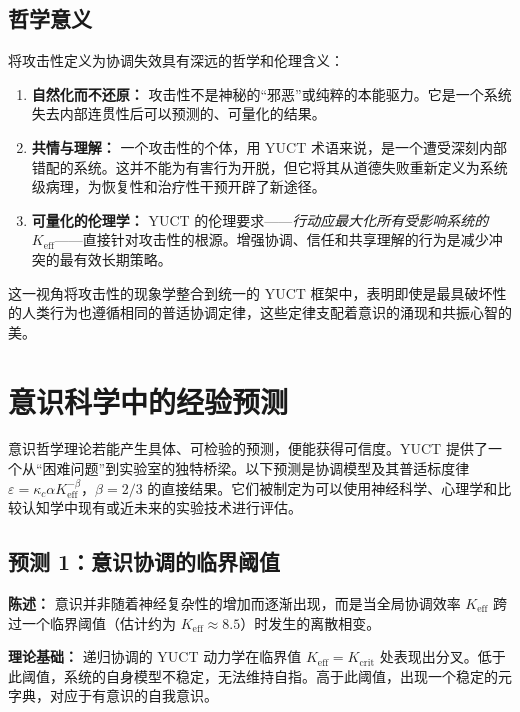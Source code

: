 \documentclass[12pt,a4paper]{article}
\begin{document}
		\subsection{哲学意义}
		
		将攻击性定义为协调失效具有深远的哲学和伦理含义：
		
		\begin{enumerate}
		\item \textbf{自然化而不还原：} 攻击性不是神秘的“邪恶”或纯粹的本能驱力。它是一个系统失去内部连贯性后可以预测的、可量化的结果。
		\item \textbf{共情与理解：} 一个攻击性的个体，用 YUCT 术语来说，是一个遭受深刻内部错配的系统。这并不能为有害行为开脱，但它将其从道德失败重新定义为系统级病理，为恢复性和治疗性干预开辟了新途径。
		\item \textbf{可量化的伦理学：} YUCT 的伦理要求——\textit{行动应最大化所有受影响系统的 $K_{\mathrm{eff}}$}——直接针对攻击性的根源。增强协调、信任和共享理解的行为是减少冲突的最有效长期策略。
		\end{enumerate}
		
		这一视角将攻击性的现象学整合到统一的 YUCT 框架中，表明即使是最具破坏性的人类行为也遵循相同的普适协调定律，这些定律支配着意识的涌现和共振心智的美。
		
		\section{意识科学中的经验预测}
		
		意识哲学理论若能产生具体、可检验的预测，便能获得可信度。YUCT 提供了一个从“困难问题”到实验室的独特桥梁。以下预测是协调模型及其普适标度律 \(\varepsilon = \kappa_c \alpha K_{\mathrm{eff}}^{-\beta}\)，\(\beta = 2/3\) 的直接结果。它们被制定为可以使用神经科学、心理学和比较认知学中现有或近未来的实验技术进行评估。
		
		\subsection{预测 1：意识协调的临界阈值}
		
		\textbf{陈述：} 意识并非随着神经复杂性的增加而逐渐出现，而是当全局协调效率 \(K_{\mathrm{eff}}\) 跨过一个临界阈值（估计约为 \(K_{\mathrm{eff}} \approx 8.5\)）时发生的离散相变。
		
		\textbf{理论基础：} 递归协调的 YUCT 动力学在临界值 \(K_{\mathrm{eff}} = K_{\mathrm{crit}}\) 处表现出分叉。低于此阈值，系统的自身模型不稳定，无法维持自指。高于此阈值，出现一个稳定的元字典，对应于有意识的自我意识。
		
\end{document}
